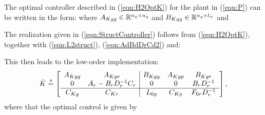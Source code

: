 \begin{lem}
The optimal controller described in (\ref{eqn:H2OptK}) for the plant in (\ref{eqn:P}) can be written in the form: 
where $\szo{A_{Kgg}}{n_g\times n_g}$ and $\szo{B_{Kgg}}{n_g\times l_w}$ and
\end{lem}
\begin{pf} The realization given in (\ref{eqn:StructController}) follows from (\ref{eqn:H2OptK}), together with (\ref{eqn:L2struct}),  (\ref{eqn:AdBdDrCd2}) and:
\end{pf}
%
This then leads to the low-order implementation:
\begin{equation}
\bar K \shorteq \ma{\arr{cc|ccc}{A_{Kgg}  & A_{Kgr} & B_{Kgy}& A_{Kgp} &B_{Kgr}\\
                  0&A_r-B_rD_r^{-1}C_r &0 &0&B_rD_r^{-1}\\\hline
                  C_{Kg}&  C_{Kr}& L_{0y}&C_{Kp}&F_{0r}D_{r}^{-1}}}, \label{low_order_K}
\end{equation}
where that the optimal control is given by

